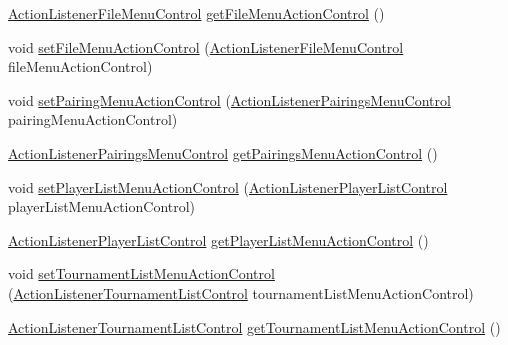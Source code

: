 \begin{DoxyCompactItemize}
\item 
\hyperlink{classde_1_1turnierverwaltung_1_1control_1_1_action_listener_file_menu_control}{Action\+Listener\+File\+Menu\+Control} \hyperlink{classde_1_1turnierverwaltung_1_1control_1_1_main_control_a4876261b275c9ea8f97d8f97258ec840}{get\+File\+Menu\+Action\+Control} ()
\item 
void \hyperlink{classde_1_1turnierverwaltung_1_1control_1_1_main_control_ac245f58245ae8d02af67a511d35509cf}{set\+File\+Menu\+Action\+Control} (\hyperlink{classde_1_1turnierverwaltung_1_1control_1_1_action_listener_file_menu_control}{Action\+Listener\+File\+Menu\+Control} file\+Menu\+Action\+Control)
\item 
void \hyperlink{classde_1_1turnierverwaltung_1_1control_1_1_main_control_a157f5e9af7915edb8b7a314731d58e85}{set\+Pairing\+Menu\+Action\+Control} (\hyperlink{classde_1_1turnierverwaltung_1_1control_1_1_action_listener_pairings_menu_control}{Action\+Listener\+Pairings\+Menu\+Control} pairing\+Menu\+Action\+Control)
\item 
\hyperlink{classde_1_1turnierverwaltung_1_1control_1_1_action_listener_pairings_menu_control}{Action\+Listener\+Pairings\+Menu\+Control} \hyperlink{classde_1_1turnierverwaltung_1_1control_1_1_main_control_adc7b9e9d38e5fe9ee547b3b75f6c848c}{get\+Pairings\+Menu\+Action\+Control} ()
\item 
void \hyperlink{classde_1_1turnierverwaltung_1_1control_1_1_main_control_a63968bf77d18a91c0fd42016bdf0df0c}{set\+Player\+List\+Menu\+Action\+Control} (\hyperlink{classde_1_1turnierverwaltung_1_1control_1_1_action_listener_player_list_control}{Action\+Listener\+Player\+List\+Control} player\+List\+Menu\+Action\+Control)
\item 
\hyperlink{classde_1_1turnierverwaltung_1_1control_1_1_action_listener_player_list_control}{Action\+Listener\+Player\+List\+Control} \hyperlink{classde_1_1turnierverwaltung_1_1control_1_1_main_control_a92656c7c31410d49830587348e5ffa50}{get\+Player\+List\+Menu\+Action\+Control} ()
\item 
void \hyperlink{classde_1_1turnierverwaltung_1_1control_1_1_main_control_ad53b73998f25d535f1ae712fcea0f915}{set\+Tournament\+List\+Menu\+Action\+Control} (\hyperlink{classde_1_1turnierverwaltung_1_1control_1_1_action_listener_tournament_list_control}{Action\+Listener\+Tournament\+List\+Control} tournament\+List\+Menu\+Action\+Control)
\item 
\hyperlink{classde_1_1turnierverwaltung_1_1control_1_1_action_listener_tournament_list_control}{Action\+Listener\+Tournament\+List\+Control} \hyperlink{classde_1_1turnierverwaltung_1_1control_1_1_main_control_a766b9228700c65135a15c44708b291e5}{get\+Tournament\+List\+Menu\+Action\+Control} ()

\end{DoxyCompactItemize}
